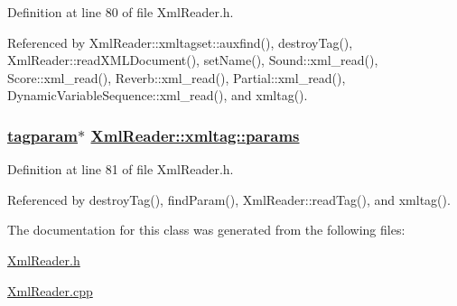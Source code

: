 Definition at line 80 of file Xml\-Reader.h.

Referenced by Xml\-Reader::xmltagset::auxfind(), destroy\-Tag(), Xml\-Reader::read\-XMLDocument(), set\-Name(), Sound::xml\_\-read(), Score::xml\_\-read(), Reverb::xml\_\-read(), Partial::xml\_\-read(), Dynamic\-Variable\-Sequence::xml\_\-read(), and xmltag().\hypertarget{classXmlReader_1_1xmltag_o1}{
\subsubsection[params]{\setlength{\rightskip}{0pt plus 5cm}\hyperlink{classXmlReader_1_1tagparam}{tagparam}$\ast$ \hyperlink{classXmlReader_1_1xmltag_o1}{Xml\-Reader::xmltag::params}}}
\label{classXmlReader_1_1xmltag_o1}




Definition at line 81 of file Xml\-Reader.h.

Referenced by destroy\-Tag(), find\-Param(), Xml\-Reader::read\-Tag(), and xmltag().

The documentation for this class was generated from the following files:\begin{CompactItemize}
\item 
\hyperlink{XmlReader_8h}{Xml\-Reader.h}\item 
\hyperlink{XmlReader_8cpp}{Xml\-Reader.cpp}\end{CompactItemize}
